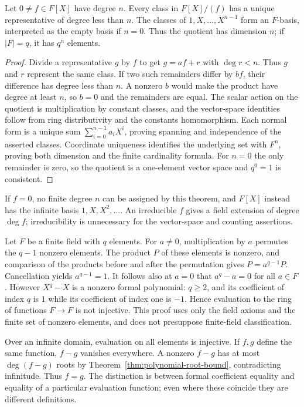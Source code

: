 \begin{theorem}\label{thm:polynomial-quotient-basis}
Let $0\ne f\in F[X]$ have degree $n$. Every class in $F[X]/(f)$
has a unique representative of degree less than $n$.
The classes of $1,X,\ldots,X^{n-1}$ form an $F$-basis, interpreted
as the empty basis if $n=0$. Thus the quotient has dimension $n$;
if $|F|=q$, it has $q^n$ elements.
\end{theorem}
\begin{proof}
Divide a representative $g$ by $f$ to get $g=af+r$ with
$\deg r<n$. Thus $g$ and $r$ represent the same class.
If two such remainders differ by $bf$, their difference has
degree less than $n$. A nonzero $b$ would make the product have
degree at least $n$, so $b=0$ and the remainders are equal.
The scalar action on the quotient is multiplication by constant
classes, and the vector-space identities follow from ring
distributivity and the constants homomorphism. Each normal form
is a unique sum $\sum_{i=0}^{n-1}a_iX^i$, proving spanning
and independence of the asserted classes. Coordinate uniqueness
identifies the underlying set with $F^n$, proving both dimension
and the finite cardinality formula. For $n=0$ the only remainder
is zero, so the quotient is a one-element vector space and
$q^0=1$ is consistent.
\end{proof}
If $f=0$, no finite degree $n$ can be assigned by this theorem,
and $F[X]$ instead has the infinite basis $1,X,X^2,\ldots$.
An irreducible $f$ gives a field extension of degree $\deg f$;
irreducibility is unnecessary for the vector-space and counting
assertions.

Let $F$ be a finite field with $q$ elements. For $a\ne0$,
multiplication by $a$ permutes the $q-1$ nonzero elements.
The product $P$ of these elements is nonzero, and comparison of
the products before and after the permutation gives
$P=a^{q-1}P$. Cancellation yields $a^{q-1}=1$.
It follows also at $a=0$ that $a^q-a=0$ for all $a\in F$.
However $X^q-X$ is a nonzero formal polynomial: $q\ge2$, and its
coefficient of index $q$ is $1$ while its coefficient of index one
is $-1$. Hence evaluation to the ring of functions $F\to F$ is
not injective. This proof uses only the field axioms and the finite
set of nonzero elements, and does not presuppose finite-field
classification.

Over an infinite domain, evaluation on all elements is injective.
If $f,g$ define the same function, $f-g$ vanishes everywhere.
A nonzero $f-g$ has at most $\deg(f-g)$ roots by
Theorem~\ref{thm:polynomial-root-bound}, contradicting infinitude.
Thus $f=g$. The distinction is between formal coefficient equality
and equality of a particular evaluation function; even where these
coincide they are different definitions.


